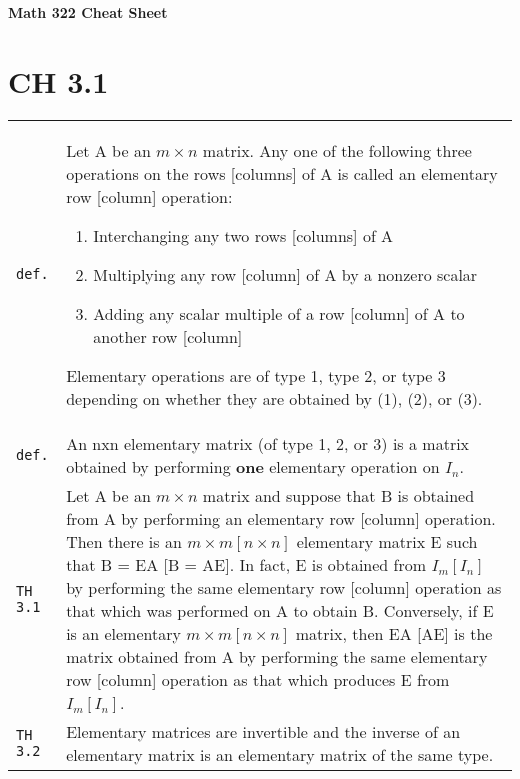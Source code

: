 \documentclass[10pt,landscape]{article}
\begin{document}
\raggedright
\footnotesize
\begin{multicols}{3}


\setlength{\premulticols}{0pt}
\setlength{\postmulticols}{0pt}
\setlength{\multicolsep}{0pt}
\setlength{\columnsep}{0pt}

\begin{center}
     \Large{\textbf{Math 322 Cheat Sheet}} \\
\end{center}

\section{CH 3.1}
\newlength{\MyLen}
\begin{tabular}{@{}p{\the\MyLen}%
                @{}p{\linewidth-\the\MyLen}@{}} %
\verb!def.! & Let A be an $m\times n$ matrix. Any one of the following three operations on the rows [columns] of A is called an elementary row [column] operation:
             \begin{enumerate}[(1)]
             \item Interchanging any two rows [columns] of A
             \item Multiplying any row [column] of A by a nonzero scalar
             \item Adding any scalar multiple of a row [column] of A to another row [column]
             \end{enumerate}
             Elementary operations are of type 1, type 2, or type 3 depending on whether they are obtained by (1), (2), or (3).\\
\verb!def.! & An nxn elementary matrix (of type 1, 2, or 3) is a matrix obtained by performing \textbf{one} elementary operation on $I_n$.\\
\verb!TH 3.1! & Let A be an $m\!\times\! n$ matrix and suppose that B is obtained from A by performing an elementary row [column] operation. Then there is an 
               $m\!\times\! m [n\!\times\! n]$ elementary matrix E such that B = EA [B = AE]. In fact, E is obtained from $I_m [I_n]$ by performing the same elementary row [column] 
               operation as that which was performed on A to obtain B. Conversely, if E is an elementary $m\!\times\! m [n\!\times\! n]$ matrix, then EA [AE] is the matrix obtained 
               from A by performing the same elementary row [column] operation as that which produces E from $I_m [I_n]$.\\
\verb!TH 3.2! & Elementary matrices are invertible and the inverse of an elementary matrix is an elementary matrix of the same type.\\
\end{tabular}


\end{multicols}
\end{document}
